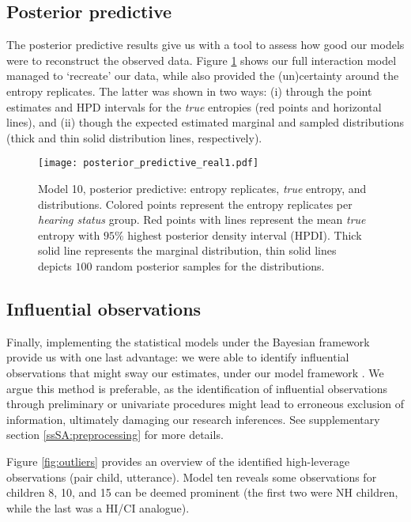 \subsection{Posterior predictive} \label{sS:results_posterior}
%
The posterior predictive results give us with a tool to assess how good our models were to reconstruct the observed data. Figure \ref{fig:predictive1} shows our full interaction model managed to `recreate' our data, while also provided the (un)certainty around the entropy replicates. The latter was shown in two ways: (i) through the point estimates and HPD intervals for the \textit{true} entropies (red points and horizontal lines), and (ii) though the expected estimated marginal and sampled distributions (thick and thin solid distribution lines, respectively).
%
\begin{figure}[!h]
	\centering
	\texttt{[image: posterior\_predictive\_real1.pdf]}
	\caption[Model 10, posterior predictive: entropy replicates, \textit{true} entropy, and distributions]{Model 10, posterior predictive: entropy replicates, \textit{true} entropy, and distributions. Colored points represent the entropy replicates per \textit{hearing status} group. Red points with lines represent the mean \textit{true} entropy with $95\%$ highest posterior density interval (HPDI). Thick solid line represents the marginal distribution, thin solid lines depicts $100$ random posterior samples for the distributions.}
	\label{fig:predictive1}
\end{figure}
%
%
\subsection{Influential observations} \label{sS:results_outliers}
%
Finally, implementing the statistical models under the Bayesian framework provide us with one last advantage: we were able to identify influential observations that might sway our estimates, under our model framework \citep{McElreath_2020}. We argue this method is preferable, as the identification of influential observations through preliminary or univariate procedures might lead to erroneous exclusion of information, ultimately damaging our research inferences. See supplementary section \ref{ssSA:preprocessing} for more details.

Figure \ref{fig:outliers} provides an overview of the identified high-leverage observations (pair child, utterance). Model ten reveals some observations for children 8, 10, and 15 can be deemed prominent (the first two were NH children, while the last was a HI/CI analogue). 

